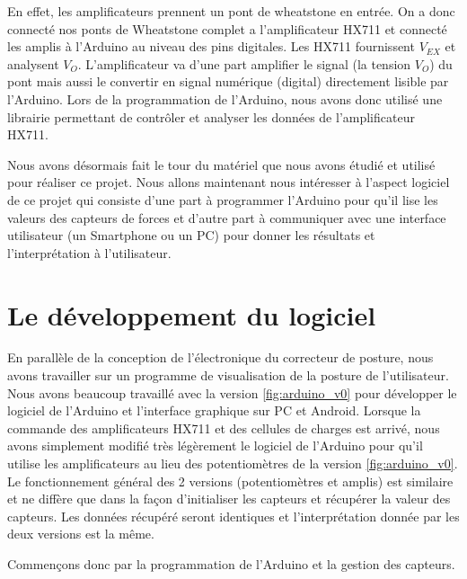 \documentclass{polytech/polytech}
\begin{document}
 En effet, les amplificateurs prennent un pont de wheatstone en entrée. On a donc connecté nos ponts de Wheatstone complet a l'amplificateur HX711 et connecté les amplis à l'Arduino au niveau des pins digitales. Les HX711 fournissent $V_{EX}$ et analysent $V_O$. L'amplificateur va d'une part amplifier le signal (la tension $V_O$) du pont mais aussi le convertir en signal numérique (digital) directement lisible par l'Arduino. Lors de la programmation de l'Arduino, nous avons donc utilisé une librairie permettant de contrôler et analyser les données de l'amplificateur HX711.

Nous avons désormais fait le tour du matériel que nous avons étudié et utilisé pour réaliser ce projet. Nous allons maintenant nous intéresser à l'aspect logiciel de ce projet qui consiste d'une part à programmer l'Arduino pour qu'il lise les valeurs des capteurs de forces et d'autre part à communiquer avec une interface utilisateur (un Smartphone ou un PC) pour donner les résultats et l'interprétation à l'utilisateur.

\chapter{Le développement du logiciel}
\label{chap:logiciel}

En parallèle de la conception de l'électronique du correcteur de posture, nous avons travailler sur un programme de visualisation de la posture de l'utilisateur. Nous avons beaucoup travaillé avec la version \ref{fig:arduino_v0} pour développer le logiciel de l'Arduino et l'interface graphique sur PC et Android. Lorsque la commande des amplificateurs HX711 et des cellules de charges est arrivé, nous avons simplement modifié très légèrement le logiciel de l'Arduino pour qu'il utilise les amplificateurs au lieu des potentiomètres de la version \ref{fig:arduino_v0}. Le fonctionnement général des 2 versions (potentiomètres et amplis) est similaire et ne diffère que dans la façon d'initialiser les capteurs et récupérer la valeur des capteurs. Les données récupéré seront identiques et l'interprétation donnée par les deux versions est la même.

Commençons donc par la programmation de l'Arduino et la gestion des capteurs.

\end{document}
